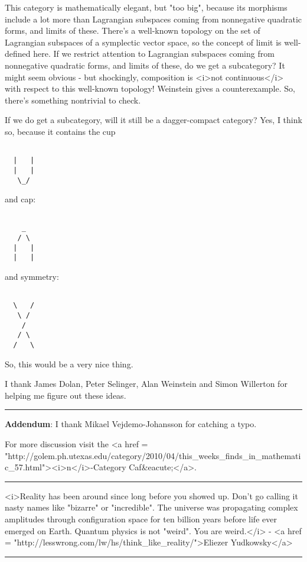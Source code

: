 This category is mathematically elegant, but "too big",
because its morphisms include a lot more than Lagrangian subspaces
coming from nonnegative quadratic forms, and limits of these.  There's
a well-known topology on the set of Lagrangian subspaces of a
symplectic vector space, so the concept of limit is well-defined here.
If we restrict attention to Lagrangian subspaces coming from
nonnegative quadratic forms, and limits of these, do we get a
subcategory?  It might seem obvious - but shockingly, composition is
<i>not continuous</i> with respect to this well-known topology!
Weinstein gives a counterexample.  So, there's something nontrivial to
check.

If we do get a subcategory, will it still be a dagger-compact category?
Yes, I think so, because it contains the cup


\begin{verbatim}

  |   |
  |   |
   \_/
\end{verbatim}
    
and cap:

\begin{verbatim}

    _
   / \
  |   |
  |   |
\end{verbatim}
    
and symmetry:


\begin{verbatim}

  \   /
   \ /
    /
   / \
  /   \
\end{verbatim}
    
So, this would be a very nice thing.

I thank James Dolan, Peter Selinger,
Alan Weinstein and Simon Willerton for 
helping me figure out these ideas.


\par\noindent\rule{\textwidth}{0.4pt}


\textbf{Addendum}: I thank Mikael Vejdemo-Johansson for catching a typo.

For more discussion visit the
<a href = "http://golem.ph.utexas.edu/category/2010/04/this_weeks_finds_in_mathematic_57.html"><i>n</i>-Category Caf&eacute;</a>.

\par\noindent\rule{\textwidth}{0.4pt}


<i>Reality has been around since long before you showed up.  Don't go
calling it nasty names like "bizarre" or
"incredible".  The universe was propagating complex
amplitudes through configuration space for ten billion years before
life ever emerged on Earth.  Quantum physics is not "weird".
You are weird.</i> - <a href = "http://lesswrong.com/lw/hs/think_like_reality/">Eliezer Yudkowsky</a>

\par\noindent\rule{\textwidth}{0.4pt}

